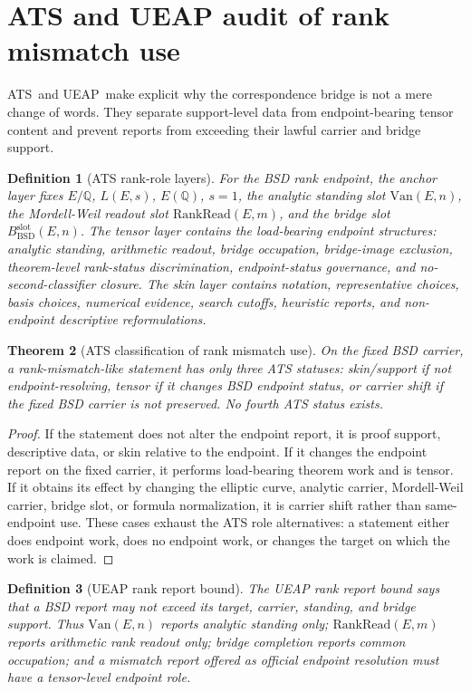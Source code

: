 \documentclass[11pt]{article}
\newtheorem{theorem}{Theorem}[section]
\newtheorem{definition}[theorem]{Definition}
\newcommand{\Q}{\mathbb{Q}}
\newcommand{\BSD}{\mathrm{BSD}}
\newcommand{\UEAP}{\textsc{UEAP}}
\newcommand{\Van}{\mathrm{Van}}
\newcommand{\RankRead}{\mathrm{RankRead}}
\newcommand{\ATS}{\textsc{ATS}}
\newcommand{\slot}{\mathrm{slot}}
\begin{document}
\section{ATS and UEAP audit of rank mismatch use}

\ATS\ and \UEAP\ make explicit why the correspondence bridge is not a mere change of words. They separate support-level data from endpoint-bearing tensor content and prevent reports from exceeding their lawful carrier and bridge support.

\begin{definition}[ATS rank-role layers]
For the BSD rank endpoint, the anchor layer fixes $E/\Q$, $L(E,s)$, $E(\Q)$, $s=1$, the analytic standing slot $\Van(E,n)$, the Mordell-Weil readout slot $\RankRead(E,m)$, and the bridge slot $B_{\BSD}^{\slot}(E,n)$. The tensor layer contains the load-bearing endpoint structures: analytic standing, arithmetic readout, bridge occupation, bridge-image exclusion, theorem-level rank-status discrimination, endpoint-status governance, and no-second-classifier closure. The skin layer contains notation, representative choices, basis choices, numerical evidence, search cutoffs, heuristic reports, and non-endpoint descriptive reformulations.
\end{definition}

\begin{theorem}[ATS classification of rank mismatch use]\label{thm:ats-mismatch}
On the fixed BSD carrier, a rank-mismatch-like statement has only three ATS statuses: skin/support if not endpoint-resolving, tensor if it changes BSD endpoint status, or carrier shift if the fixed BSD carrier is not preserved. No fourth ATS status exists.
\end{theorem}

\begin{proof}
If the statement does not alter the endpoint report, it is proof support, descriptive data, or skin relative to the endpoint. If it changes the endpoint report on the fixed carrier, it performs load-bearing theorem work and is tensor. If it obtains its effect by changing the elliptic curve, analytic carrier, Mordell-Weil carrier, bridge slot, or formula normalization, it is carrier shift rather than same-endpoint use. These cases exhaust the ATS role alternatives: a statement either does endpoint work, does no endpoint work, or changes the target on which the work is claimed.
\end{proof}

\begin{definition}[UEAP rank report bound]
The UEAP rank report bound says that a BSD report may not exceed its target, carrier, standing, and bridge support. Thus $\Van(E,n)$ reports analytic standing only; $\RankRead(E,m)$ reports arithmetic rank readout only; bridge completion reports common occupation; and a mismatch report offered as official endpoint resolution must have a tensor-level endpoint role.
\end{definition}
\end{document}
